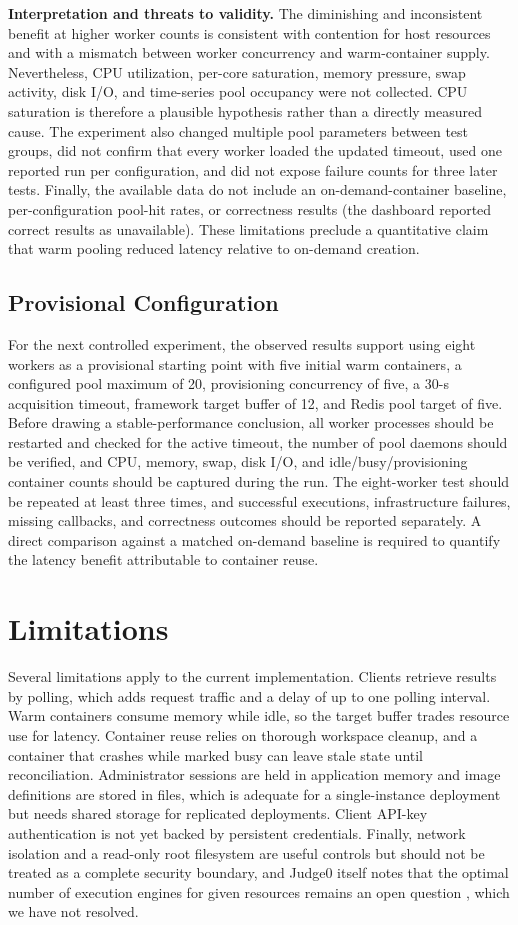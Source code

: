 \documentclass[conference]{IEEEtran}
\begin{document}
\textbf{Interpretation and threats to validity.} The diminishing and inconsistent benefit at higher worker counts is consistent with contention for host resources and with a mismatch between worker concurrency and warm-container supply. Nevertheless, CPU utilization, per-core saturation, memory pressure, swap activity, disk I/O, and time-series pool occupancy were not collected. CPU saturation is therefore a plausible hypothesis rather than a directly measured cause. The experiment also changed multiple pool parameters between test groups, did not confirm that every worker loaded the updated timeout, used one reported run per configuration, and did not expose failure counts for three later tests. Finally, the available data do not include an on-demand-container baseline, per-configuration pool-hit rates, or correctness results (the dashboard reported correct results as unavailable). These limitations preclude a quantitative claim that warm pooling reduced latency relative to on-demand creation.

\subsection{Provisional Configuration}
For the next controlled experiment, the observed results support using eight workers as a provisional starting point with five initial warm containers, a configured pool maximum of 20, provisioning concurrency of five, a 30-s acquisition timeout, framework target buffer of 12, and Redis pool target of five. Before drawing a stable-performance conclusion, all worker processes should be restarted and checked for the active timeout, the number of pool daemons should be verified, and CPU, memory, swap, disk I/O, and idle/busy/provisioning container counts should be captured during the run. The eight-worker test should be repeated at least three times, and successful executions, infrastructure failures, missing callbacks, and correctness outcomes should be reported separately. A direct comparison against a matched on-demand baseline is required to quantify the latency benefit attributable to container reuse.
\section{Limitations}
Several limitations apply to the current implementation. Clients retrieve results by polling, which adds request traffic and a delay of up to one polling interval. Warm containers consume memory while idle, so the target buffer trades resource use for latency. Container reuse relies on thorough workspace cleanup, and a container that crashes while marked busy can leave stale state until reconciliation. Administrator sessions are held in application memory and image definitions are stored in files, which is adequate for a single-instance deployment but needs shared storage for replicated deployments. Client API-key authentication is not yet backed by persistent credentials. Finally, network isolation and a read-only root filesystem are useful controls but should not be treated as a complete security boundary, and Judge0 itself notes that the optimal number of execution engines for given resources remains an open question \cite{dosilovic2020}, which we have not resolved.
\end{document}
